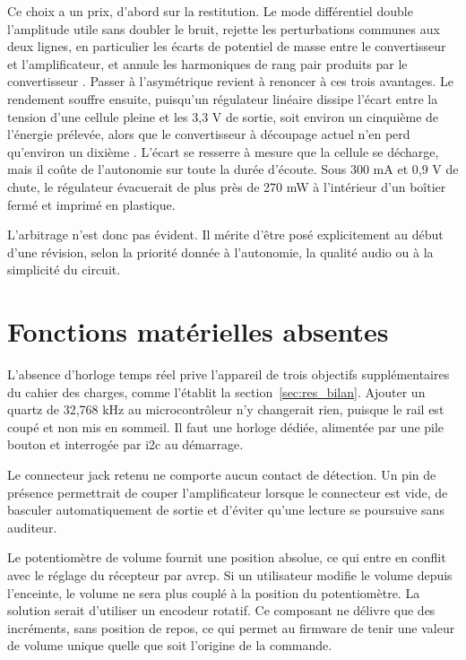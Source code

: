 Ce choix a un prix, d'abord sur la restitution. Le mode différentiel double l'amplitude utile sans doubler le bruit, rejette les perturbations communes aux deux lignes, en particulier les écarts de potentiel de masse entre le convertisseur et l'amplificateur, et annule les harmoniques de rang pair produits par le convertisseur \cite{TI_PCM5242}. Passer à l'asymétrique revient à renoncer à ces trois avantages. Le rendement souffre ensuite, puisqu'un régulateur linéaire dissipe l'écart entre la tension d'une cellule pleine et les 3,3 V de sortie, soit environ un cinquième de l'énergie prélevée, alors que le convertisseur à découpage actuel n'en perd qu'environ un dixième \cite{TI_TPS62A01}. L'écart se resserre à mesure que la cellule se décharge, mais il coûte de l'autonomie sur toute la durée d'écoute. Sous 300 mA et 0,9 V de chute, le régulateur évacuerait de plus près de 270 mW à l'intérieur d'un boîtier fermé et imprimé en plastique.

L'arbitrage n'est donc pas évident. Il mérite d'être posé explicitement au début d'une révision, selon la priorité donnée à l'autonomie, la qualité audio ou à la simplicité du circuit.

\section{Fonctions matérielles absentes}
\label{sec:amel_materiel}

L'absence d'horloge temps réel prive l'appareil de trois objectifs supplémentaires du cahier des charges, comme l'établit la section~\ref{sec:res_bilan}. Ajouter un quartz de 32,768 kHz au microcontrôleur n'y changerait rien, puisque le rail est coupé et non mis en sommeil. Il faut une horloge dédiée, alimentée par une pile bouton et interrogée par \gls{i2c} au démarrage.

Le connecteur jack retenu ne comporte aucun contact de détection. Un pin de présence permettrait de couper l'amplificateur lorsque le connecteur est vide, de basculer automatiquement de sortie et d'éviter qu'une lecture se poursuive sans auditeur.

Le potentiomètre de volume fournit une position absolue, ce qui entre en conflit avec le réglage du récepteur par \gls{avrcp}. Si un utilisateur modifie le volume depuis l'enceinte, le volume ne sera plus couplé à la position du potentiomètre. La solution serait d'utiliser un encodeur rotatif. Ce composant ne délivre que des incréments, sans position de repos, ce qui permet au firmware de tenir une valeur de volume unique quelle que soit l'origine de la commande.

